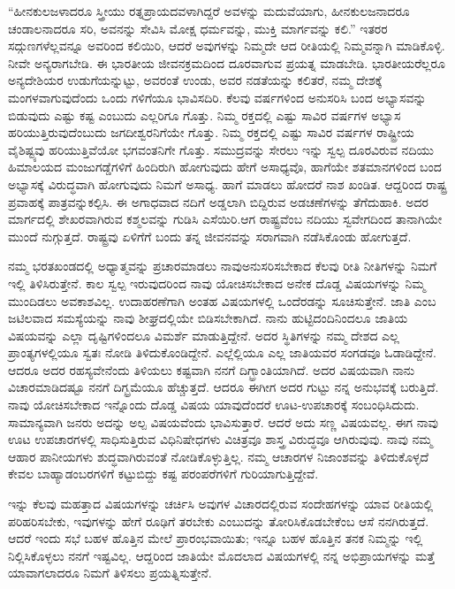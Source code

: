 “ಹೀನಕುಲಜಳಾದರೂ ಸ್ತ್ರೀಯು ರತ್ನಪ್ರಾಯದವಳಾಗಿದ್ದರೆ ಅವಳನ್ನು ಮದುವೆಯಾಗು, ಹೀನಕುಲಜನಾದರೂ ಚಂಡಾಲನಾದರೂ ಸರಿ, ಅವನನ್ನು ಸೇವಿಸಿ ಮೋಕ್ಷ ಧರ್ಮವನ್ನು, ಮುಕ್ತಿ ಮಾರ್ಗವನ್ನು ಕಲಿ.” ಇತರರ ಸದ್ಗುಣಗಳೆಲ್ಲವನ್ನೂ ಅವರಿಂದ ಕಲಿಯಿರಿ, ಆದರೆ ಅವುಗಳನ್ನು ನಿಮ್ಮದೇ ಆದ ರೀತಿಯಲ್ಲಿ ನಿಮ್ಮವನ್ನಾಗಿ ಮಾಡಿಕೊಳ್ಳಿ. ನೀವೇ ಅನ್ಯರಾಗಬೇಡಿ. ಈ ಭಾರತೀಯ ಜೀವನಕ್ರಮದಿಂದ ದೂರವಾಗುವ ಪ್ರಯತ್ನ ಮಾಡಬೇಡಿ. ಭಾರತೀಯರೆಲ್ಲರೂ ಅನ್ಯದೇಶಿಯರ ಉಡುಗೆಯನ್ನುಟ್ಟು, ಅವರಂತೆ ಉಂಡು, ಅವರ ನಡತೆಯನ್ನು ಕಲಿತರೆ, ನಮ್ಮ ದೇಶಕ್ಕೆ ಮಂಗಳವಾಗುವುದೆಂದು ಒಂದು ಗಳಿಗೆಯೂ ಭಾವಿಸದಿರಿ. ಕೆಲವು ವರ್ಷಗಳಿಂದ ಅನುಸರಿಸಿ ಬಂದ ಅಭ್ಯಾಸವನ್ನು ಬಿಡುವುದು ಎಷ್ಟು ಕಷ್ಟ ಎಂಬುದು ಎಲ್ಲರಿಗೂ ಗೊತ್ತು. ನಿಮ್ಮ ರಕ್ತದಲ್ಲಿ ಎಷ್ಟು ಸಾವಿರ ವರ್ಷಗಳ ಅಭ್ಯಾಸ ಹರಿಯುತ್ತಿರುವುದೆಂಬುದು ಜಗದೀಶ್ವರನಿಗೆಯೇ ಗೊತ್ತು. ನಿಮ್ಮ ರಕ್ತದಲ್ಲಿ ಎಷ್ಟು ಸಾವಿರ ವರ್ಷಗಳ ರಾಷ್ಟ್ರೀಯ ವೈಶಿಷ್ಟ್ಯವು ಹರಿಯುತ್ತಿವೆಯೋ ಭಗವಂತನಿಗೇ ಗೊತ್ತು. ಸಮುದ್ರವನ್ನು ಸೇರಲು ಇನ್ನು ಸ್ವಲ್ಪ ದೂರವಿರುವ ನದಿಯು ಹಿಮಾಲಯದ ಮಂಜುಗಡ್ಡೆಗಳಿಗೆ ಹಿಂದಿರುಗಿ ಹೋಗುವುದು ಹೇಗೆ ಅಸಾಧ್ಯವೊ, ಹಾಗೆಯೇ ಶತಮಾನಗಳಿಂದ ಬಂದ ಅಭ್ಯಾಸಕ್ಕೆ ವಿರುದ್ಧವಾಗಿ ಹೋಗುವುದು ನಿಮಗೆ ಅಸಾಧ್ಯ. ಹಾಗೆ ಮಾಡಲು ಹೋದರೆ ನಾಶ ಖಂಡಿತ. ಆದ್ದರಿಂದ ರಾಷ್ಟ್ರ ಪ್ರವಾಹಕ್ಕೆ ಪಾತ್ರವನ್ನು\break ಕಲ್ಪಿಸಿ. ಈ ಅಗಾಧವಾದ ನದಿಗೆ ಅಡ್ಡಲಾಗಿ ಬಿದ್ದಿರುವ ಅಡಚಣೆಗಳನ್ನು ತೆಗೆದು\-ಹಾಕಿ. ಅದರ ಮಾರ್ಗದಲ್ಲಿ ಶೇಖರವಾಗಿರುವ ಕಶ್ಮಲವನ್ನು ಗುಡಿಸಿ ಎಸೆಯಿರಿ.\break ಆಗ ರಾಷ್ಟ್ರವೆಂಬ ನದಿಯು ಸ್ವವೇಗದಿಂದ ತಾನಾಗಿಯೇ ಮುಂದೆ ನುಗ್ಗುತ್ತದೆ. ರಾಷ್ಟ್ರವು ಏಳಿಗೆಗೆ ಬಂದು ತನ್ನ ಜೀವನವನ್ನು ಸರಾಗವಾಗಿ ನಡೆಸಿಕೊಂಡು ಹೋಗುತ್ತದೆ.

ನಮ್ಮ ಭರತಖಂಡದಲ್ಲಿ ಅಧ್ಯಾತ್ಮವನ್ನು ಪ್ರಚಾರಮಾಡಲು ನಾವು\break ಅನುಸರಿಸಬೇಕಾದ ಕೆಲವು ರೀತಿ ನೀತಿಗಳನ್ನು ನಿಮಗೆ ಇಲ್ಲಿ ತಿಳಿಸಿರುತ್ತೇನೆ. ಕಾಲ ಸ್ವಲ್ಪ ಇರುವುದರಿಂದ ನಾವು ಯೋಚಿಸಬೇಕಾದ ಅನೇಕ ದೊಡ್ಡ ವಿಷಯಗಳನ್ನು ನಿಮ್ಮ ಮುಂದಿಡಲು ಅವಕಾಶವಿಲ್ಲ. ಉದಾಹರಣೆಗಾಗಿ ಅಂತಹ ವಿಷಯಗಳಲ್ಲಿ ಒಂದೆರಡನ್ನು ಸೂಚಿಸುತ್ತೇನೆ. ಜಾತಿ ಎಂಬ ಜಟಿಲವಾದ ಸಮಸ್ಯೆಯನ್ನು ನಾವು ಶೀಘ್ರದಲ್ಲಿಯೇ ಬಿಡಿಸಬೇಕಾಗಿದೆ. ನಾನು ಹುಟ್ಟಿದಂದಿನಿಂದಲೂ ಜಾತಿಯ ವಿಷಯವನ್ನು ಎಲ್ಲಾ ದೃಷ್ಟಿಗಳಿಂದಲೂ ವಿಮರ್ಶೆ ಮಾಡುತ್ತಿದ್ದೇನೆ. ಅದರ ಸ್ಥಿತಿಗಳನ್ನು ನಮ್ಮ ದೇಶದ ಎಲ್ಲ ಪ್ರಾಂತ್ಯಗಳಲ್ಲಿಯೂ ಸ್ವತಃ ನೋಡಿ ತಿಳಿದುಕೊಂಡಿದ್ದೇನೆ. ಎಲ್ಲೆಲ್ಲಿಯೂ ಎಲ್ಲ ಜಾತಿಯವರ ಸಂಗಡವೂ ಓಡಾಡಿದ್ದೇನೆ. ಆದರೂ ಅದರ ರಹಸ್ಯವೇನೆಂದು ತಿಳಿಯಲು ಕಷ್ಟವಾಗಿ ನನಗೆ ದಿಗ್ಭ್ರಾಂತಿಯಾಗಿದೆ. ಅದರ ವಿಷಯವಾಗಿ ನಾನು ವಿಚಾರಮಾಡಿದಷ್ಟೂ ನನಗೆ ದಿಗ್ಭ್ರಮೆಯೂ ಹೆಚ್ಚುತ್ತದೆ. ಆದರೂ ಈಗೀಗ ಅದರ ಗುಟ್ಟು ನನ್ನ ಅನುಭವಕ್ಕೆ ಬರುತ್ತಿದೆ. ನಾವು ಯೋಚಿಸಬೇಕಾದ ಇನ್ನೊಂದು ದೊಡ್ಡ ವಿಷಯ ಯಾವುದೆಂದರೆ ಊಟ-ಉಪಚಾರಕ್ಕೆ ಸಂಬಂಧಿಸಿದುದು. ಸಾಮಾನ್ಯವಾಗಿ ಜನರು ಅದನ್ನು ಅಲ್ಪ ವಿಷಯವೆಂದು ಭಾವಿಸುತ್ತಾರೆ. ಆದರೆ ಅದು ಸಣ್ಣ ವಿಷಯವಲ್ಲ. ಈಗ ನಾವು ಊಟ ಉಪಚಾರಗಳಲ್ಲಿ ಸಾಧಿಸುತ್ತಿರುವ ವಿಧಿನಿಷೇಧಗಳು ವಿಚಿತ್ರವೂ ಶಾಸ್ತ್ರ ವಿರುದ್ಧವೂ ಆಗಿರುವುವು. ನಾವು ನಮ್ಮ ಆಹಾರ ಪಾನೀಯಗಳು ಶುದ್ಧವಾಗಿರುವಂತೆ ನೋಡಿಕೊಳ್ಳುತ್ತಿಲ್ಲ. ನಮ್ಮ ಆಚಾರಗಳ ನಿಜಾಂಶವನ್ನು ತಿಳಿದುಕೊಳ್ಳದೆ ಕೇವಲ ಬಾಹ್ಯಾಡಂಬರಗಳಿಗೆ ಕಟ್ಟುಬಿದ್ದು ಕಷ್ಟ ಪರಂಪರೆಗಳಿಗೆ ಗುರಿಯಾಗು\-ತ್ತಿದ್ದೇವೆ.

ಇನ್ನು ಕೆಲವು ಮಹತ್ತಾದ ವಿಷಯಗಳನ್ನು ಚರ್ಚಿಸಿ ಅವುಗಳ ವಿಚಾರದಲ್ಲಿರುವ ಸಂದೇಹಗಳನ್ನು ಯಾವ ರೀತಿಯಲ್ಲಿ ಪರಿಹರಿಸಬೇಕು, ಇವುಗಳನ್ನು ಹೇಗೆ ರೂಢಿಗೆ ತರಬೇಕು ಎಂಬುದನ್ನು ತೋರಿಸಿಕೊಡಬೇಕೆಂಬ ಆಸೆ ನನಗಿರುತ್ತದೆ. ಆದರೆ ಇಂದು ಸಭೆ ಬಹಳ ಹೊತ್ತಿನ ಮೇಲೆ ಪ್ರಾರಂಭವಾಯಿತು; ಇನ್ನೂ ಬಹಳ ಹೊತ್ತಿನ ತನಕ ನಿಮ್ಮನ್ನು ಇಲ್ಲಿ ನಿಲ್ಲಿಸಿಕೊಳ್ಳಲು ನನಗೆ ಇಷ್ಟವಿಲ್ಲ. ಆದ್ದರಿಂದ ಜಾತಿಯೇ ಮೊದಲಾದ ವಿಷಯಗಳಲ್ಲಿ ನನ್ನ ಅಭಿಪ್ರಾಯಗಳನ್ನು ಮತ್ತೆ ಯಾವಾಗಲಾದರೂ ನಿಮಗೆ ತಿಳಿಸಲು ಪ್ರಯತ್ನಿಸುತ್ತೇನೆ.

